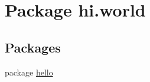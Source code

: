 \hypertarget{namespacehi_1_1world}{}\section{Package hi.\+world}
\label{namespacehi_1_1world}
\subsection*{Packages}
\begin{DoxyCompactItemize}
\item 
package \mbox{\hyperlink{namespacehi_1_1world_1_1hello}{hello}}
\end{DoxyCompactItemize}
